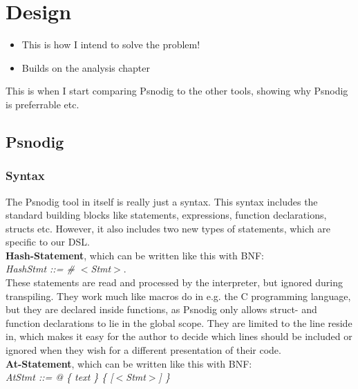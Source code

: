 \chapter{Design}
\begin{itemize}
    \item This is how I intend to solve the problem! %
    \item Builds on the analysis chapter
\end{itemize}

This is when I start comparing Psnodig to the other tools, showing why Psnodig is preferrable etc.

\section{Psnodig}

\subsection{Syntax}

The Psnodig tool in itself is really just a syntax. This syntax includes the standard building blocks like statements, expressions, function declarations, structs etc. However, it also includes two new types of statements, which are specific to our DSL. \hfill \\

\textbf{Hash-Statement}, which can be written like this with BNF: \hfill \\

\textit{HashStmt ::= \# $<$Stmt$>$}. \hfill \\

These statements are read and processed by the interpreter, but ignored during transpiling. They work much like macros do in e.g. the C programming language, but they are declared inside functions, as Psnodig only allows struct- and function declarations to lie in the global scope. They are limited to the line reside in, which makes it easy for the author to decide which lines should be included or ignored when they wish for a different presentation of their code. \hfill \\

\textbf{At-Statement}, which can be written like this with BNF: \hfill \\

\textit{AtStmt ::= @ \{ text \} \{ [$<$Stmt$>$] \}} \hfill \\

